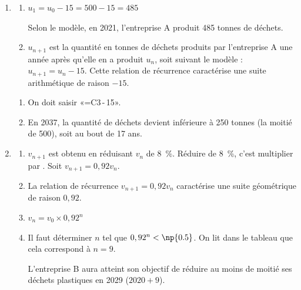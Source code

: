 \begin{enumerate}
\item
	\begin{enumerate}
		\item

		$u_{1} = u_{0} - 15 = 500 - 15 = 485 $

		Selon le modèle, en 2021, l'entreprise A produit 485 tonnes de déchets.


		\item
$u_{n+1}$ est la quantité en tonnes de déchets produits par l'entreprise A une année après qu'elle en a produit  $u_{n}$, soit suivant le modèle : $u_{n+1} = u_{n} - 15$. Cette relation de récurrence caractérise une suite arithmétique de raison $-15$.


	\end{enumerate}

	\begin{enumerate}[resume]
		\item
		On doit saisir «\textsf{=C3\,-\,15}».


		\item
En 2037, la quantité de déchets devient inférieure à 250 tonnes (la moitié de 500), soit au bout de 17 ans.

	\end{enumerate}
\item
	\begin{enumerate}
		\item
		$v_{n+1}$ est obtenu en réduisant $v_{n}$ de 8~\%. Réduire de 8~\%, c'est multiplier par . Soit $v_{n+1}=0,92 v_{n}$.

		\item
		La relation de récurrence $v_{n+1}=0,92 v_{n}$ caractérise une suite géométrique de raison $0,92$.

		\item
		$v_{n} = v_{0}\times 0,92^{n}$

		\item
			Il faut déterminer $n$ tel que $0,92^{n} < \np{0.5}$. On lit dans le tableau que cela correspond à $n=9$.

			L'entreprise B aura atteint son objectif de réduire au moins de moitié ses déchets plastiques en 2029 ($2020+9$).

	\end{enumerate}
\end{enumerate}

